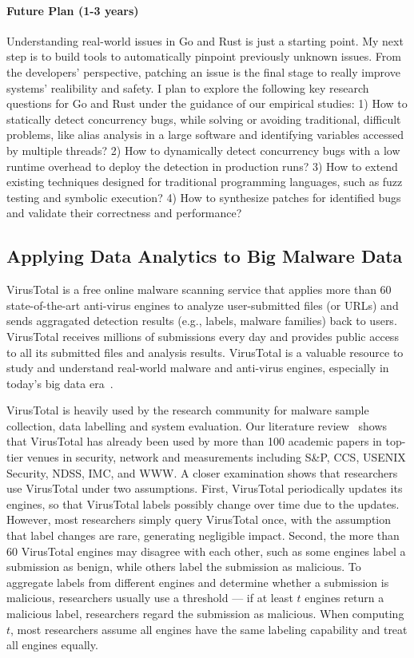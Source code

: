 \documentclass[10pt]{article}
\begin{document}
\vspace{-.1in}
\paragraph{Future Plan (1-3 years)}
Understanding real-world issues in Go and Rust is just a starting point.
My next step is to build tools to automatically pinpoint previously unknown issues. 
From the developers' perspective, patching an issue is the final 
stage to really improve systems' realibility and safety. 
I plan to explore the following key research questions for Go and Rust 
under the guidance of our empirical studies: 
1) How to statically detect concurrency bugs, 
while solving or avoiding traditional, difficult problems, 
like alias analysis in a large software
and identifying variables accessed by multiple threads?
2) How to dynamically detect concurrency bugs with a low 
runtime overhead to deploy the detection in production runs?
3) How to extend existing techniques designed for traditional programming languages, 
such as fuzz testing and symbolic execution?
4) How to synthesize patches for identified bugs and validate 
their correctness and performance?

\vspace{-.1in}
\subsection{Applying Data Analytics to Big Malware Data}
VirusTotal is a free online malware scanning service that applies 
more than 60 state-of-the-art anti-virus engines to analyze user-submitted files (or URLs)
and sends aggragated detection results (e.g., labels, malware families) back to users. 
VirusTotal receives millions of submissions every day and 
provides public access to all its submitted files and analysis results.
VirusTotal is a valuable resource to study and understand real-world malware 
and anti-virus engines, especially in today's big data era~\cite{Song16ApSys}.  

VirusTotal is heavily used by the research community for malware sample collection,
data labelling and system evaluation. 
Our literature review~\cite{vt-jianjun} shows that 
VirusTotal has already been used by more than 100 academic 
papers in top-tier venues 
in security, network and measurements including S\&P, CCS, 
USENIX Security, NDSS, IMC, and WWW.
A closer examination shows that researchers use VirusTotal under two assumptions. 
First, VirusTotal periodically updates its engines, 
so that VirusTotal labels possibly change over time due to the updates. 
However, most researchers simply query VirusTotal once, 
with the assumption that label changes are rare, 
generating negligible impact. 
Second, the more than 60 VirusTotal engines 
may disagree with each other, 
such as some engines label a submission as benign, 
while others label the submission as malicious. 
To aggregate labels from different engines and determine whether a submission is malicious,
researchers usually use a threshold --- 
if at least $t$ engines return a malicious label,
researchers regard the submission as malicious. 
When computing $t$, most researchers assume all engines have the 
same labeling capability and treat all engines equally. 
\end{document}

